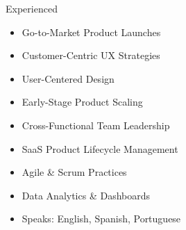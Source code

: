 %
Experienced
  \begin{itemize}
    \setlength\itemsep{-0.3em}
\item Go-to-Market Product Launches
\item Customer-Centric UX Strategies
\item User-Centered Design
\item Early-Stage Product Scaling
\item Cross-Functional Team Leadership
\item SaaS Product Lifecycle Management
\item Agile & Scrum Practices
\item Data Analytics \& Dashboards
\item Speaks: English, Spanish, Portuguese
    \end{itemize}
\\

